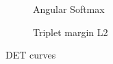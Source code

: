 \begin{figure}[h]
\begin{center}
\begin{subfigure}[t]{7.5cm}
		\caption{Angular Softmax}
	\end{subfigure}
	\begin{subfigure}[t]{7.5cm}
		\caption{Triplet margin L2}
	\end{subfigure}
\end{center}
\caption{DET curves}
\label{fig:det}
\end{figure}

